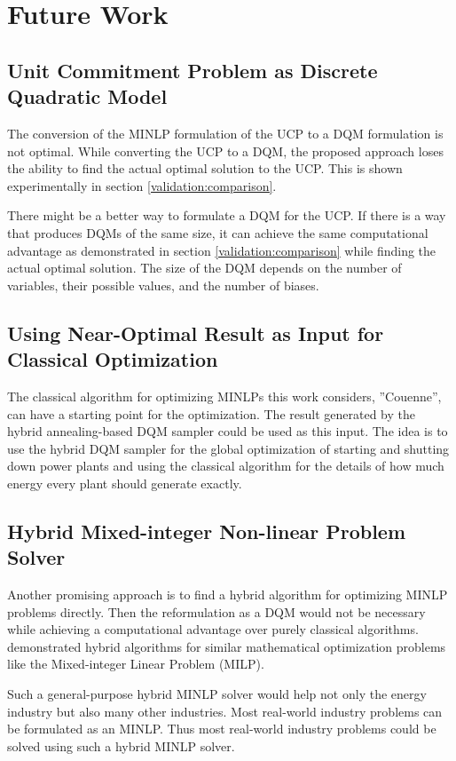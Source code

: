 \section{Future Work}

\subsection{Unit Commitment Problem as Discrete Quadratic Model}

The conversion of the MINLP formulation of the UCP to a DQM formulation is not optimal.
While converting the UCP to a DQM, the proposed approach loses the ability to find the actual optimal solution to the UCP.
This is shown experimentally in section \ref{validation:comparison}.

There might be a better way to formulate a DQM for the UCP.
If there is a way that produces DQMs of the same size, it can achieve the same computational advantage as demonstrated in section \ref{validation:comparison} while finding the actual optimal solution.
The size of the DQM depends on the number of variables, their possible values, and the number of biases.

\subsection{Using Near-Optimal Result as Input for Classical Optimization}

The classical algorithm for optimizing MINLPs this work considers, ''Couenne'', can have a starting point for the optimization.
The result generated by the hybrid annealing-based DQM sampler could be used as this input.
The idea is to use the hybrid DQM sampler for the global optimization of starting and shutting down power plants and using the classical algorithm for the details of how much energy every plant should generate exactly.

\subsection{Hybrid Mixed-integer Non-linear Problem Solver}

Another promising approach is to find a hybrid algorithm for optimizing MINLP problems directly.
Then the reformulation as a DQM would not be necessary while achieving a computational advantage over purely classical algorithms.
\citeauthor{Ajagekar2020} demonstrated hybrid algorithms for similar mathematical optimization problems like the Mixed-integer Linear Problem (MILP).
\cite{Ajagekar2020}

Such a general-purpose hybrid MINLP solver would help not only the energy industry but also many other industries.
Most real-world industry problems can be formulated as an MINLP.
\cite{Belotti2009}
Thus most real-world industry problems could be solved using such a hybrid MINLP solver.
